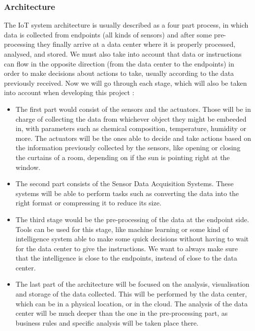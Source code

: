 \documentclass[12pt]{article}
\begin{document}
\subsubsection{Architecture}

The IoT system architecture is usually described as a four part process, in which data is collected from endpoints (all kinds of sensors) and after some pre-processing they finally arrive at a data center where it is properly processed, analysed, and stored. We must also take into account that data or instructions can flow in the opposite direction (from the data center to the endpoints) in order to make decisions about actions to take, usually according to the data previously received. Now we will go through each stage, which will also be taken into account when developing this project \cite{digi}\cite{marlabs}:

\begin{itemize}
    \item The first part would consist of the sensors and the actuators. Those will be in charge of collecting the data from whichever object they might be embeeded in, with parameters such as chemical composition, temperature, humidity or more. The actuators will be the ones able to decide and take actions based on the information previously collected by the sensors, like opening or closing the curtains of a room, depending on if the sun is pointing right at the window. 
    \item The second part consists of the Sensor Data Acquisition Systems. These systems will be able to perform tasks such as converting the data into the right format or compressing it to reduce its size.
    \item The third stage would be the pre-processing of the data at the endpoint side. Tools can be used for this stage, like machine learning or some kind of intelligence system able to make some quick decisions without having to wait for the data center to give the instructions. We want to always make sure that the intelligence is close to the endpoints, instead of close to the data center. 
    \item The last part of the architecture will be focused on the analysis, visualisation and storage of the data collected. This will be performed by the data center, which can be in a physical location, or in the cloud. The analysis of the data center will be much deeper than the one in the pre-processing part, as business rules and specific analysis will be taken place there.
\end{itemize}
\end{document}
